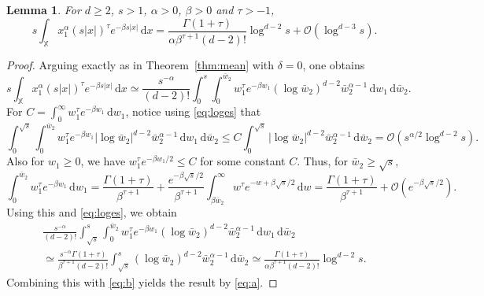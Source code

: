 \documentclass[11pt,reqno]{amsart}
\numberwithin{equation}{section}
\newtheorem{lemma}[theorem]{Lemma}
\theoremstyle{definition}
\newcommand{\XX}{\mathbb{X}}
\newcommand{\diff}{{\,\mathrm d}}
\begin{document}
\begin{lemma}\label{lem:mex}
	For $d \ge 2$, $s>1$, $\alpha>0$, $\beta >0$ and $\tau >-1$,
	\begin{equation*}
	s\int_{\XX} x_1^\alpha (s|x|)^{\tau}  e^{-\beta s |x|} \diff x= \frac{\Gamma(1+\tau)}{\alpha \beta^{\tau +1} (d-2)!} \log^{d-2} s + \mathcal{O}(\log^{d-3} s).
	\end{equation*} 
\end{lemma}

\begin{proof}
	Arguing exactly as in Theorem~\ref{thm:mean} with $\delta=0$, one obtains
	\begin{equation}\label{eq:a}
	s\int_{\XX} x_1^\alpha (s|x|)^{\tau}  e^{-\beta s |x|} \diff x 
	\simeq \frac{s^{-\alpha}}{(d-2)!}  \int_0^s \int_{0}^{\bar w_2} w_1^{\tau} e^{- \beta w_1} (\log  \bar w_2)^{d-2}  \bar w_2^{\alpha-1} \diff w_1 \diff  \bar w_2.
	\end{equation}
	For $C=\int_0^\infty w_1^\tau e^{-\beta w_1} \diff w_1$, notice using \eqref{eq:loges} that
	\begin{equation}\label{eq:b}
	\int_0^{\sqrt{s}} \int_{0}^{\bar w_2} w_1^{\tau}  e^{-\beta w_1} |\log \bar w_2|^{d-2} \bar w_2^{\alpha-1} \diff w_1 \diff \bar w_2  \le C \int_0^{\sqrt{s}} |\log \bar w_2|^{d-2} \bar w_2^{\alpha-1} \diff \bar w_2 = \mathcal{O}(s^{\alpha/2} \log^{d-2} s).
	\end{equation}
	Also for $w_1 \ge 0$,  we have $w_1^\tau e^{-\beta w_1/2} \le C$ for some constant $C$. Thus, for $\bar w_2 \ge \sqrt{s},$
	$$
	\int_{0}^{\bar w_2} w_1^{\tau} e^{- \beta w_1} \diff w_1=\frac{\Gamma(1+\tau)}{\beta^{\tau+1}}+ \frac{e^{-\beta \sqrt{s}/2}}{\beta^{\tau+1}} \int_{\beta \bar w_2}^\infty w^\tau e^{-w+\beta \sqrt{s}/2} \diff w=\frac{\Gamma(1+\tau)}{\beta^{\tau+1}}+ \mathcal{O}(e^{-\beta \sqrt{s}/2}).
	$$
	Using this and \eqref{eq:loges}, we obtain
	\begin{multline*}
	 \frac{s^{-\alpha}}{(d-2)!} \int_{\sqrt{s}}^s \int_{0}^{\bar w_2} w_1^{\tau} e^{- \beta w_1} (\log \bar w_2)^{d-2} \bar w_2^{\alpha-1} \diff w_1 \diff\bar w_2\\
	  \simeq \frac{s^{-\alpha} \Gamma(1+\tau)}{\beta^{\tau +1}(d-2)!} \int_{\sqrt{s}}^s (\log \bar w_2)^{d-2} \bar w_2^{\alpha-1} \diff \bar w_2
	   \simeq \frac{\Gamma(1+\tau)}{\alpha \beta^{\tau +1}(d-2)!}\log^{d-2} s.
	\end{multline*}
	Combining this with \eqref{eq:b} yields the result by \eqref{eq:a}.
\end{proof}
\end{document}
